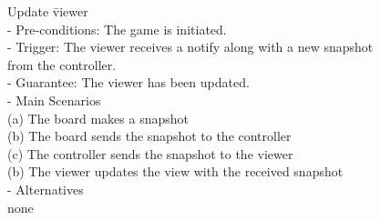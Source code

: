 {\normalsize
\begin{tabbing}
Update \= viewer \\
- Pre-conditions: The game is initiated. \\
- Trigger: The viewer receives a notify along with a new snapshot \\
\>from the controller. \\
- Guarantee: The viewer has been updated. \\
- Main Scenarios \\
\>(a) The board makes a snapshot \\
\>(b) The board sends the snapshot to the controller \\
\>(c) The controller sends the snapshot to the viewer \\
\>(b) The viewer updates the view with the received snapshot \\
- Alternatives \\
\>none \\
\end{tabbing}
}